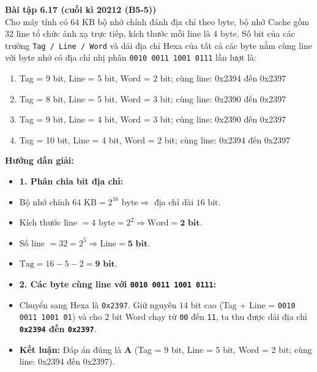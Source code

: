 \textbf{Bài tập 6.17 (cuối kì 20212 (B5-5))}\\
Cho máy tính có $64\text{ KB}$ bộ nhớ chính đánh địa chỉ theo byte, bộ nhớ Cache gồm $32$ line tổ chức ánh xạ trực tiếp, kích thước mỗi line là $4\text{ byte}$. Số bit của các trường \texttt{Tag / Line / Word} và dải địa chỉ Hexa của tất cả các byte nằm cùng line với byte nhớ có địa chỉ nhị phân \texttt{0010 0011 1001 0111} lần lượt là:
\begin{enumerate}[label=\Alph*.]
    \item Tag = 9 bit, Line = 5 bit, Word = 2 bit; cùng line: 0x2394 đến 0x2397
    \item Tag = 8 bit, Line = 5 bit, Word = 3 bit; cùng line: 0x2390 đến 0x2397
    \item Tag = 9 bit, Line = 4 bit, Word = 3 bit; cùng line: 0x2390 đến 0x2397
    \item Tag = 10 bit, Line = 4 bit, Word = 2 bit; cùng line: 0x2394 đến 0x2397
\end{enumerate}
\textbf{Hướng dẫn giải:}
\begin{itemize}
    \item \textbf{1. Phân chia bit địa chỉ:}
    \item Bộ nhớ chính $64\text{ KB} = 2^{16}\text{ byte} \Rightarrow$ địa chỉ dài $16\text{ bit}$.
    \item Kích thước line $= 4\text{ byte} = 2^2 \Rightarrow \text{Word} = \mathbf{2\text{ bit}}$.
    \item Số line $= 32 = 2^5 \Rightarrow \text{Line} = \mathbf{5\text{ bit}}$.
    \item $\text{Tag} = 16 - 5 - 2 = \mathbf{9\text{ bit}}$.
    \item \textbf{2. Các byte cùng line với \texttt{0010 0011 1001 0111}:}
    \item Chuyển sang Hexa là \texttt{0x2397}. Giữ nguyên $14$ bit cao (Tag + Line = \texttt{0010 0011 1001 01}) và cho $2$ bit Word chạy từ \texttt{00} đến \texttt{11}, ta thu được dải địa chỉ \textbf{\texttt{0x2394} đến \texttt{0x2397}}.
    \item \textbf{Kết luận:} Đáp án đúng là \textbf{A} (Tag = 9 bit, Line = 5 bit, Word = 2 bit; cùng line: 0x2394 đến 0x2397).
\end{itemize}

